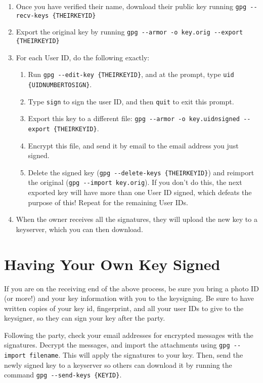 \documentclass{article}
\begin{document}
\begin{enumerate}
\item Once you have verified their name, download their public key
  running \texttt{gpg -{}-recv-keys \{THEIRKEYID\}}
\item Export the original key by running \texttt{gpg -{}-armor -o
    key.orig -{}-export \{THEIRKEYID\}}
\item For each User ID, do the following exactly:
  \begin{enumerate}
  \item Run \texttt{gpg -{}-edit-key \{THEIRKEYID\}}, and at the
    prompt, type \texttt{uid \{UIDNUMBERTOSIGN\}}.
  \item Type \texttt{sign} to sign the user ID, and then \texttt{quit}
    to exit this prompt.
  \item Export this key to a different file: \texttt{gpg -{}-armor -o
      key.uid\textit{n}signed -{}-export \{THEIRKEYID\}}.
  \item Encrypt this file, and send it by email to the email address
    you just signed.
  \item Delete the signed key (\texttt{gpg -{}-delete-keys
      \{THEIRKEYID\}}) and reimport the original (\texttt{gpg
      -{}-import key.orig}).  If you don't do this, the next exported
    key will have more than one User ID signed, which defeats the
    purpose of this!  Repeat for the remaining User IDs.
  \end{enumerate}
\item When the owner receives all the signatures, they will upload the
  new key to a keyserver, which you can then download.
\end{enumerate}

\section*{Having Your Own Key Signed}
If you are on the receiving end of the above process, be sure you
bring a photo ID (or more!) and your key information with you to the
keysigning.  Be sure to have written copies of your key id,
fingerprint, and all your user IDs to give to the keysigner, so they
can sign your key after the party.

Following the party, check your email addresses for encrypted messages
with the signatures.  Decrypt the messages, and import the attachments
using \texttt{gpg -{}-import filename}.  This will apply the
signatures to your key.  Then, send the newly signed key to a
keyserver so others can download it by running the command \texttt{gpg
  -{}-send-keys \{KEYID\}}.
\end{document}
